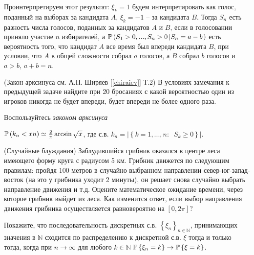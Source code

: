 \begin{remark}
Проинтерпретируем этот результат: $\xi_k =1$ будем 
интерпретировать как голос, поданный на выборах за кандидата $A$, 
$\xi _k =-1$ -- за кандидата $B$. Тогда $S_n $ есть разность числа 
голосов, поданных за кандидатов $A$ и $B$, если в голосовании 
приняло участие $n$ избирателей, а $\mathrm{{\mathbb P}}\left( {S_1 >0,...,S_n >0\left| {S_n 
=a-b} \right.} \right)$ есть вероятность того, что кандидат $A$ все 
время был впереди кандидата $B$, при условии, что $A$ в общей 
сложности собрал $a$ голосов, а $B$ собрал $b$ голосов и $a>b$, 
$a+b=n$. 
\end{remark}

\begin{problem}(Закон арксинуса см. А.Н. Ширяев [\ref{chiraiev}] Т.2)
В условиях замечания к предыдущей задаче 
найдите при 20 бросаниях с какой вероятностью один из игроков никогда не будет впереди,  будет впереди не более одного раза.
\end{problem}

\begin{remark} 
Воспользуйтесь \textit{законом арксинуса} 

$\mathrm{{\mathbb P}}\left( {k_n <xn} \right)\simeq 
\frac{2}{\pi }\arcsin \sqrt x $, где с.в. $k_n =\left| {\left\{ 
{k=1,...,n:\;\;S_k \ge 0} \right\}} \right|$.
\end{remark}

\begin{problem}(Случайные блуждания)
Заблудившийся грибник оказался в центре леса имеющего форму круга с радиусом 5 км. Грибник движется по следующим правилам: пройдя 100 метров в случайно выбранном направлении север-юг-запад-восток (на это у грибника уходит 2 минуты), он решает снова случайно выбрать направление движения и т.д. Оцените математическое ожидание времени, через которое грибник выйдет из леса. Как изменится ответ, если выбор направления движения грибника осуществляется равновероятно на $[0,2\pi]$? 
\end{problem}

\begin{problem} 
Покажите, что последовательность дискретных с.в. $\left\{ 
{\xi _n } \right\}_{n\in {\mathbb N}} $, принимающих значения в ${\mathbb N}$ 
сходится по распределению к дискретной с.в. $\xi $ тогда и только тогда, 
когда при $n\to \infty $ для любого $k\in {\mathbb N}$ $\mathrm{{\mathbb P}}\left\{ {\xi _n =k} 
\right\}\to \mathrm{{\mathbb P}}\left\{ {\xi =k} \right\}$.
\end{problem}

